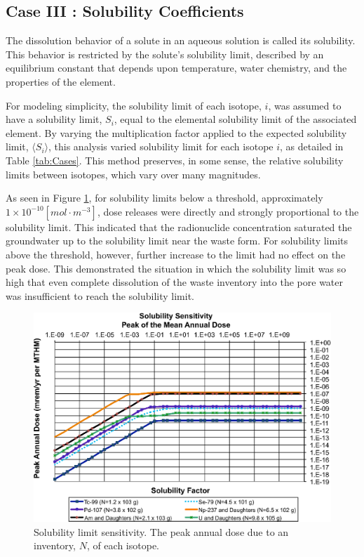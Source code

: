
\subsection{Case III : Solubility Coefficients}

The dissolution behavior of a solute in an aqueous solution is called its 
solubility. This behavior is restricted by the solute's solubility limit, described  
by an equilibrium constant that depends upon temperature, water chemistry, and 
the properties of the element. 

For modeling simplicity, the solubility limit of each isotope, $i$, was assumed 
to have a solubility limit, $S_i$, equal to the elemental solubility limit of 
the associated element.  By varying the multiplication factor applied to the 
expected solubility limit, $\langle S_i\rangle$, this analysis varied solubility 
limit for each isotope $i$, as detailed in Table \ref{tab:Cases}.  This method 
preserves, in some sense, the relative solubility limits between isotopes, which 
vary over many magnitudes.  

As seen in Figure \ref{fig:SolSum}, for solubility limits below a threshold, 
approximately $1\times10^{-10}[mol\cdot m^{-3}]$, dose releases were directly 
and strongly proportional to the solubility limit. This indicated that the 
radionuclide concentration saturated the groundwater up to the solubility limit 
near the waste form.  For solubility limits above the threshold, however, 
further increase to the limit had no effect on the peak dose. This demonstrated 
the situation in which the solubility limit was so high that even complete 
dissolution of the waste inventory into the pore water was insufficient to reach 
the solubility limit.

\begin{figure}[H]
  \centering
  \includegraphics[width=\linewidth]{solubility.eps}
  \caption{Solubility limit sensitivity. The peak annual dose due to an 
  inventory, 
  $N$, of each isotope.}
  \label{fig:SolSum}
\end{figure}

